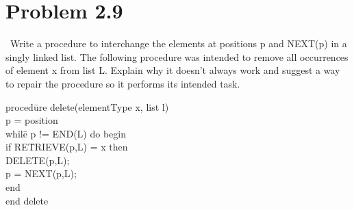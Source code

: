 \documentclass{article}
\begin{document}
	
	
	
		\section{Problem 2.9}
	\	Write a procedure to interchange the elements at positions p and NEXT(p) in a singly linked list. The following procedure was intended to remove all occurrences of element x from list L. Explain why it doesn't always work and suggest a way to repair the procedure so it performs its intended task. 

	\begin{algorithm}
	
	\begin{tabbing}
 proced\=ure delete(elementType x, list l) \+ \\
	  p = position \\
	  whil\=e p != END(L) do begin \+ \\
		if RE\=TRIEVE(p,L) = x then \+\\
			DELETE(p,L); \-\\
		  p = NEXT(p,L); \- \\
	 end\- \\
    end {delete} \\
\end{tabbing}
\end{algorithm}
\end{document}
